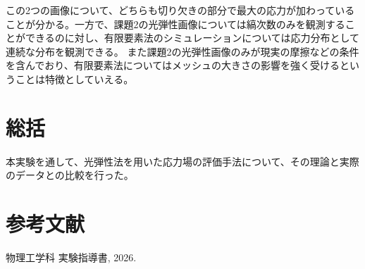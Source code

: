 \documentclass[uplatex,dvipdfmx,titlepage]{jsarticle}
\begin{document}
この2つの画像について、どちらも切り欠きの部分で最大の応力が加わっていることが分かる。一方で、課題2の光弾性画像については縞次数のみを観測することができるのに対し、有限要素法のシミュレーションについては応力分布として連続な分布を観測できる。
また課題2の光弾性画像のみが現実の摩擦などの条件を含んでおり、有限要素法についてはメッシュの大きさの影響を強く受けるということは特徴としていえる。

\section{総括}
本実験を通して、光弾性法を用いた応力場の評価手法について、その理論と実際のデータとの比較を行った。

\section*{参考文献}
\begin{enumerate}[label={[\arabic*]}]
    \item 物理工学科 実験指導書, 2026.
\end{enumerate}
\end{document}
